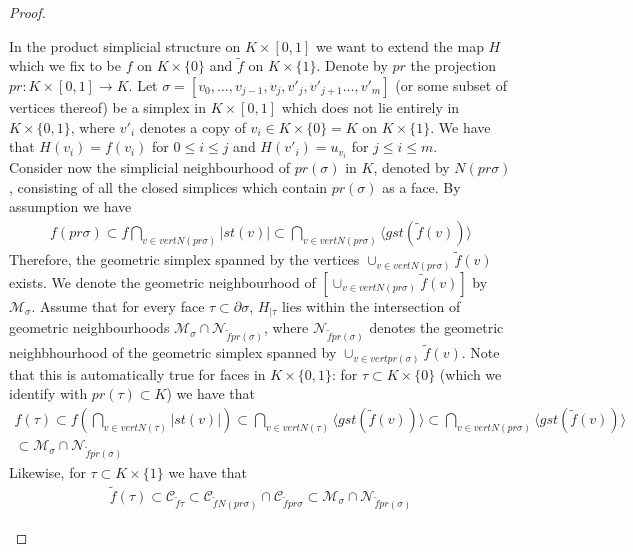 \documentclass[a4paper,11pt]{article}
\theoremstyle{definition}
\theoremstyle{plain}
\theoremstyle{remark}
\begin{document}
{\begin{proof}
\begin{enumerate}
 In the product simplicial structure on $K \times [0,1]$ we want to extend the map $H$ which we fix to be $f$ on $K\times \{0\}$ and $\tilde{f}$ on $K\times \{1\}$. Denote by $pr$ the projection $pr: K\times [0,1] \rightarrow K$.  Let  $\sigma = [v_0, \dots, v_{j-1}, v_j, v'_j, v'_{j+1}\dots, v'_{m}]$ (or some subset of vertices thereof) be a simplex in $K\times [0,1]$ which does not lie entirely in $K \times \{0,1\}$, where $v'_{i}$ denotes a copy of $v_i \in K \times \{0\} = K$ on $K \times \{1\}$. We have that $H(v_i) = f(v_i)$ for $0\leq i\leq j$ and $H(v'_i) = u_{v_i}$ for $j\leq i\leq m$.  \\

Consider now the simplicial neighbourhood of $pr(\sigma)$ in $K$, denoted by $N(pr \sigma)$, consisting of all the closed simplices which contain $pr(\sigma)$ as a face. By assumption we have
\begin{align*}
f (pr \sigma) \subset f \bigcap_{v \in vert N(pr \sigma)} |st(v)| \subset  \bigcap_{v \in vert N(pr \sigma)} \langle gst(\tilde{f}(v)) \rangle 
\end{align*}
Therefore, the geometric simplex spanned by the vertices $\cup_{v \in vert N(pr \sigma)}\tilde{f}(v)$ exists. We denote the geometric neighbourhood of $[\cup_{v \in vert N(pr \sigma)}\tilde{f}(v)]$  by $\mathcal{M}_{\sigma}$. Assume that for every face $\tau \subset \partial \sigma$,  $H_{|\tau}$ lies within the intersection of geometric neighbourhoods $\mathcal{M}_{\sigma} \cap \mathcal{N}_{\tilde{f}pr(\sigma)} $, where $\mathcal{N}_{\tilde{f}pr(\sigma)}$ denotes the geometric neighbhourhood of the geometric simplex spanned by $\cup_{v\in vert pr(\sigma)} \tilde{f}(v)$. Note that this is automatically true for faces in $K \times \{0,1\}$: for $\tau\subset K \times \{0\}$ (which we identify with $pr(\tau) \subset K$) we have that 
\begin{align*}
f(\tau) \subset f(\bigcap_{v \in vert N(\tau)} |st(v)|) \subset \bigcap_{v\in vert N(\tau)}\langle gst (\tilde{f}(v))\rangle \subset \bigcap_{v\in vert N(pr \sigma)}\langle gst (\tilde{f}(v))\rangle \\
\subset \mathcal{M}_{\sigma} \cap \mathcal{N}_{\tilde{f}pr(\sigma)}
\end{align*} 
Likewise, for $\tau\subset K \times \{1\}$ we have that 
\begin{align*}
\tilde{f}(\tau) \subset \mathscr{C}_{\tilde{f}\tau} \subset  \mathscr{C}_{\tilde{f} N(pr \sigma)}\cap \mathscr{C}_{\tilde{f} pr \sigma} \subset  \mathcal{M}_{\sigma} \cap \mathcal{N}_{\tilde{f}pr(\sigma)}

\end{align*}
\end{enumerate}
\end{proof}}
\end{document}
